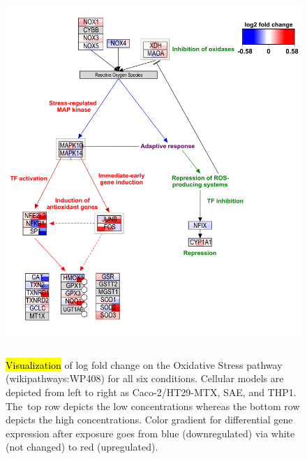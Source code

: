 \documentclass[ijms,article,accept,moreauthors,pdftex]{Definitions/mdpi}
\begin{document}
\begin{paracol}{2}
\begin{figure}[H]
\includegraphics[height=14cm,keepaspectratio]{fig3.png}
  \caption{\hl{Visualization} of log fold change on the Oxidative Stress pathway (wikipathways:WP408) for all six conditions.
{Cellular models} are depicted from left to right as {Caco-2/HT29-MTX}, SAE, and THP1. The~top row depicts the low concentrations whereas the bottom row depicts the high concentrations. {Color gradient for differential gene expression after exposure goes from blue (downregulated) via white (not changed) to red (upregulated).}}
\label{fig:fig3}
\end{figure}
\vspace{-12pt}


\end{paracol}
\end{document}
